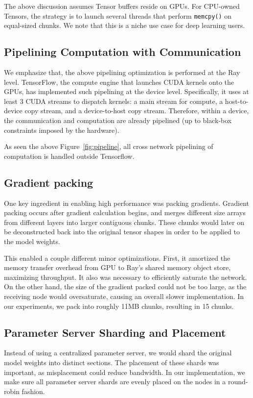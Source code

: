 The above discussion assumes Tensor buffers reside on GPUs.  For CPU-owned Tensors, the strategy is to launch several threads that perform \texttt{memcpy()} on equal-sized chunks.  We note that this is a niche use case for deep learning users.

\subsection{Pipelining Computation with Communication}

We emphasize that, the above pipelining optimization is performed at the Ray level.  TensorFlow, the compute engine that launches CUDA kernels onto the GPUs, has implemented such pipelining at the device level.  Specifically, it uses at least 3 CUDA streams to dispatch kernels: a main stream for compute, a host-to-device copy stream, and a device-to-host copy stream.  Therefore, within a device, the communication and computation are already pipelined (up to black-box constraints imposed by the hardware).


As seen the above Figure~\ref{fig:pipeline}, all cross network pipelining of computation is handled outside Tensorflow.

\subsection{Gradient packing}
One key ingredient in enabling high performance was packing gradients. Gradient packing occurs after gradient calculation begins, and merges different size arrays from different layers into larger contiguous chunks. These chunks would later on be deconstructed back into the original tensor shapes in order to be applied to the model weights.

This enabled a couple different minor optimizations. First, it amortized the memory transfer overhead from GPU to Ray's shared memory object store, maximizing throughput. It also was necessary to efficiently saturate the network. On the other hand, the size of the gradient packed could not be too large, as the receiving node would oversaturate, causing an overall slower implementation. In our experiments, we pack into roughly 11MB chunks, resulting in 15 chunks.

\subsection{Parameter Server Sharding and Placement}
Instead of using a centralized parameter server, we would shard the original model weights into distinct sections. The placement of these shards was important, as misplacement could reduce bandwidth. In our implementation, we make sure all parameter server shards are evenly placed on the nodes in a round-robin fashion.

